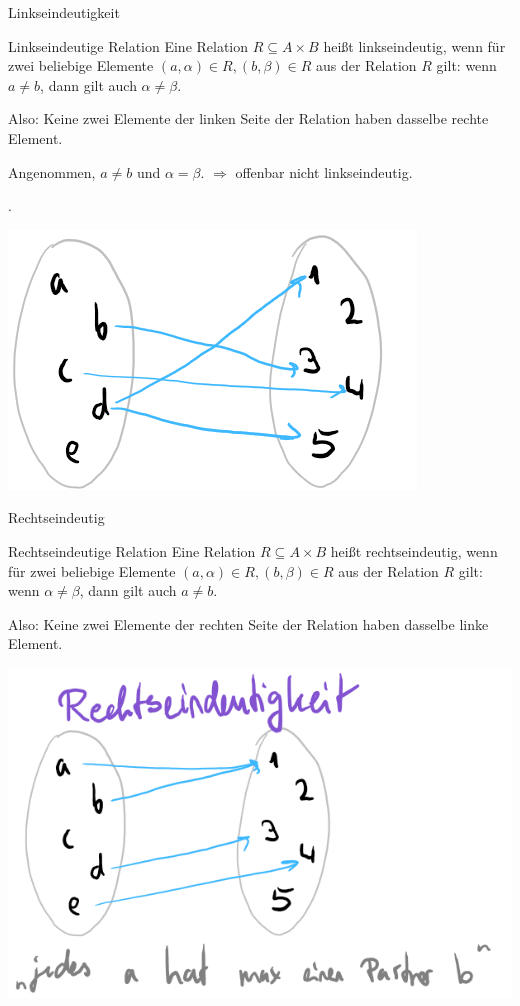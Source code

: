 \begin{frame}{Linkseindeutigkeit}
	\begin{block}{Linkseindeutige Relation}
		Eine Relation $R \subseteq A \times B$ heißt linkseindeutig\pause , wenn für zwei beliebige Elemente $(a, \alpha) \in R, (b, \beta) \in R$ aus der Relation $R$ gilt: \pause wenn $a \neq b$, dann gilt auch $\alpha \neq \beta$. 
	\end{block}\pause
	
	Also: Keine zwei Elemente der linken Seite der Relation haben dasselbe rechte Element.\pause
	
	Angenommen, $a \neq b$ und $\alpha = \beta$. \pause $\Rightarrow$ offenbar nicht linkseindeutig.\pause
	
	 .\pause
	
	\begin{center}
		\includegraphics[width=.4\linewidth]{images/mengen_linkseindeutig.png}
	\end{center}
\end{frame}

\begin{frame}{Rechtseindeutig}
	\begin{block}{Rechtseindeutige Relation}
		Eine Relation $R \subseteq A \times B$ heißt rechtseindeutig\pause , wenn für zwei beliebige Elemente $(a, \alpha) \in R, (b, \beta) \in R$ aus der Relation $R$ gilt: \pause wenn $\alpha \neq \beta$, dann gilt auch $a \neq b$. 
	\end{block}\pause
	
	Also: Keine zwei Elemente der rechten Seite der Relation haben dasselbe linke Element.\pause
	
	\begin{center}
		\includegraphics[width=.5\linewidth]{images/mengen_rechtseindeutig.png}
	\end{center}
\end{frame}

